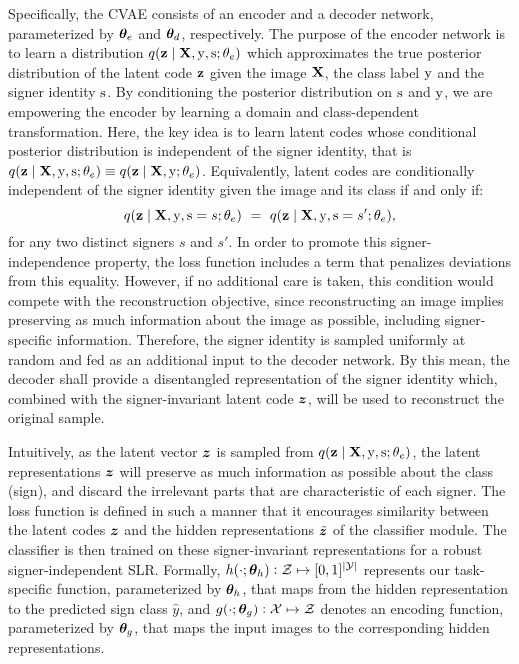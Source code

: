 Specifically, the CVAE consists of an encoder and a decoder network, parameterized by ${\bm{\theta}}_e$ and ${\bm{\theta}}_d$, respectively. The purpose of the encoder network is to learn a distribution $q({\mathbf{z}} \mid {\mathbf{X}}, {\textnormal{y}}, {\textnormal{s}}; \theta_e)$ which approximates the true posterior distribution of the latent code ${\mathbf{z}}$ given the image ${\mathbf{X}}$, the class label ${\textnormal{y}}$ and the signer identity ${\textnormal{s}}$. By conditioning the posterior distribution on ${\textnormal{s}}$ and ${\textnormal{y}}$, we are empowering the encoder by learning a domain and class-dependent transformation. Here, the key idea is to learn latent codes whose conditional posterior distribution is independent of the signer identity, that is $q({\mathbf{z}} \mid {\mathbf{X}}, {\textnormal{y}}, {\textnormal{s}}; \theta_e) \equiv q({\mathbf{z}} \mid {\mathbf{X}}, {\textnormal{y}}; \theta_e)$. Equivalently, latent codes are conditionally independent of the signer identity given the image and its class if and only if:
\begin{equation}
    \label{eq:independence}
    q({\mathbf{z}} \mid {\mathbf{X}}, {\textnormal{y}}, {\textnormal{s}}=s; \theta_e)~=~q({\mathbf{z}} \mid {\mathbf{X}}, {\textnormal{y}}, {\textnormal{s}}=s'; \theta_e),
\end{equation}
for any two distinct signers $s$ and $s'$. In order to promote this signer-independence property, the loss function includes a term that penalizes deviations from this equality. However, if no additional care is taken, this condition would compete with the reconstruction objective, since reconstructing an image implies preserving as much information about the image as possible, including signer-specific information. Therefore, the signer identity is sampled uniformly at random and fed as an additional input to the decoder network. By this mean, the decoder shall provide a disentangled representation of the signer identity which, combined with the signer-invariant latent code ${\bm{z}}$, will be used to reconstruct the original sample.

Intuitively, as the latent vector ${\bm{z}}$ is sampled from $q({\mathbf{z}} \mid {\mathbf{X}}, {\textnormal{y}}, {\textnormal{s}}; \theta_e)$, the latent representations ${\bm{z}}$ will preserve as much information as possible about the class (sign), and discard the irrelevant parts that are characteristic of each signer. The loss function is defined in such a manner that it encourages similarity between the latent codes ${\bm{z}}$ and the hidden representations $\tilde{{\bm{z}}}$ of the classifier module. The classifier is then trained on these signer-invariant representations for a robust signer-independent SLR. Formally, $h(\cdot; {\bm{\theta}}_h): {\mathcal{Z}} \mapsto [0,1]^{|{\mathcal{Y}}|}$ represents our task-specific function, parameterized by ${\bm{\theta}}_h$, that maps from the hidden representation to the predicted sign class $\hat{y}$, and $g(\cdot; {\bm{\theta}}_g): {\mathcal{X}} \mapsto {\mathcal{Z}}$ denotes an encoding function, parameterized by ${\bm{\theta}}_g$, that maps the input images to the corresponding hidden representations.

